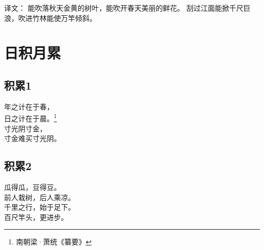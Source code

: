 译文：
能吹落秋天金黄的树叶，能吹开春天美丽的鲜花。
刮过江面能掀千尺巨浪，吹进竹林能使万竿倾斜。

\section{日积月累}
\subsection{积累1}
\begin{pinyinscope}
\huge
\noindent {}年之计在于春，\\
日之计在于晨。\footnote{南朝梁·萧统《纂要》}​\\

\noindent {}寸光阴寸金，\\
寸金难买寸光阴。
\end{pinyinscope}

\subsection{积累2}
\begin{pinyinscope}
	\huge
	\noindent {}瓜得瓜，豆得豆。\\
	
	\noindent 前人栽树，后人乘凉。\\
	
\noindent	千里之行，始于足下。\\
	
\noindent	百尺竿头，更进步。
\end{pinyinscope}

